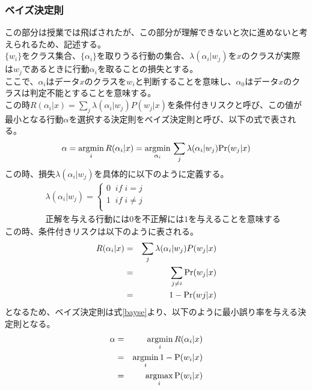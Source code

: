 \documentclass[dvipdfmx,titlepage, a4paper]{jsarticle}%
\begin{document}
\subsubsection{ベイズ決定則}
この部分は授業では飛ばされたが、この部分が理解できないと次に進めないと考えられるため、記述する。\\
$\{w_{i}\}$をクラス集合、$\{\alpha_{i}\}$を取りうる行動の集合、$\lambda(\alpha_{i}|w_{j})$を$x$のクラスが実際は$w_{j}$であるときに行動$\alpha_{i}$を取ることの損失とする。\\
ここで、$\alpha_{i}$はデータ$x$のクラスを$w_{i}$と判断することを意味し、$\alpha_{0}$はデータ$x$のクラスは判定不能とすることを意味する。\\
この時$R(\alpha_{i}|x) = \sum_{j}\lambda(\alpha_{i}|w_{j})P(w_{j}|x)$を条件付きリスクと呼び、この値が最小となる行動$\alpha$を選択する決定則をベイズ決定則と呼び、以下の式で表される。
\begin{equation}
	\alpha = \underset{i}{{\rm argmin}}\, R(\alpha_{i} | x) = \underset{\alpha_{i}}{{\rm argmin}}\, \sum_{j}\lambda(\alpha_{i}|w_{j}){\rm Pr}(w_{j}|x)\label{bayse}
\end{equation}
この時、損失$\lambda(\alpha_{i}|w_{j})$を具体的に以下のように定義する。
\begin{eqnarray*}
	&&\lambda(\alpha_{i}|w_{j}) =
	\left\{
		\begin{array}{c}
			0 \; \;if\; i = j\\
		1\;\; if \; i \neq j\\
	\end{array}
	\right.\\
	&&\mbox{正解を与える行動には0を不正解には1を与えることを意味する}
\end{eqnarray*}
この時、条件付きリスクは以下のように表される。
\begin{eqnarray*}
	R(\alpha_{i}|x) &=& \sum_{j}\lambda(\alpha_{i}|w_{j})P(w_{j}|x)\\
	&=& \sum_{j \neq i}{\rm Pr}(w_{j}|x)\\
	&=& 1 - {\rm Pr}(w{j}|x)
\end{eqnarray*}
となるため、ベイズ決定則は式\eqref{bayse}より、以下のように最小誤り率を与える決定則となる。
\begin{eqnarray}
	\alpha &=& \underset{i}{{\rm argmin}}\, R(\alpha_{i} | x) \nonumber\\
	&=& \underset{i}{{\rm argmin}}\, 1 - {\rm P}(w_{i}|x) \nonumber\\
	&=& \underset{i}{{\rm argmax}}\, {\rm P}(w_{i}|x) \label{max:bayse}
\end{eqnarray}
\end{document}
